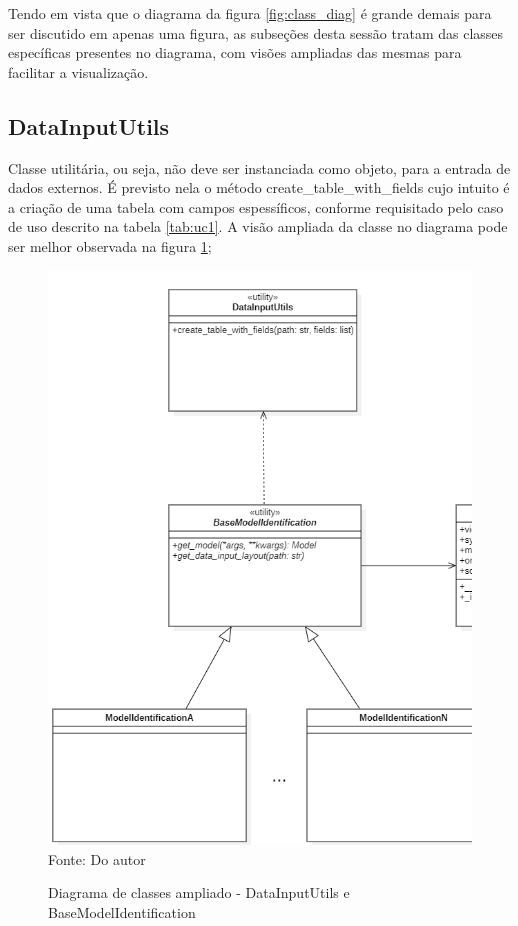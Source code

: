 Tendo em vista que o diagrama da figura \ref{fig:class_diag} é grande demais para ser discutido em apenas uma figura,
as subseções desta sessão tratam das classes específicas presentes no diagrama, com visões ampliadas das mesmas para
facilitar a visualização.

\subsection{DataInputUtils}

Classe utilitária, ou seja, não deve ser instanciada como objeto, para a entrada de dados externos.
É previsto nela o método create\_table\_with\_fields cujo intuito é a criação de uma tabela com campos espessíficos,
conforme requisitado pelo caso de uso descrito na tabela \ref{tab:uc1}.
A visão ampliada da classe no diagrama pode ser melhor observada na figura \ref{fig:class_diag_diubmi};

\begin{figure}[H]
    \centering
    \caption{Diagrama de classes ampliado - DataInputUtils e BaseModelIdentification}
    \includegraphics[scale=0.6]{figuras/class_diag_diubmi}
    \label{fig:class_diag_diubmi}
    \\
    \vspace{0cm}\hspace{0cm}\small{Fonte: Do autor}
\end{figure}

